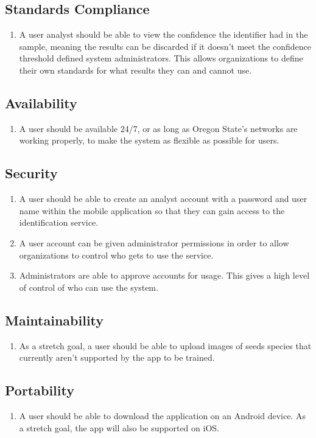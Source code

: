 \documentclass[onecolumn, draftclsnofoot,10pt, compsoc]{IEEEtran}
\begin{document}
\subsection{Standards Compliance}
\begin{enumerate}
\item
A user analyst should be able to view the confidence the identifier had in the sample, meaning the results can be discarded if it doesn't meet the confidence threshold defined system administrators. This allows organizations to define their own standards for what results they can and cannot use.
\end{enumerate}
\subsection{Availability}
\begin{enumerate}
\item
A user should be available 24/7, or as long as Oregon State's networks are working properly, to make the system as flexible as possible for users.
\end{enumerate}
\subsection{Security}

\begin{enumerate}
\item
A user should be able to create an analyst account with a password and user name within the mobile application so that they can gain access to the identification service.
\item
A user account can be given administrator permissions in order to allow organizations to control who gets to use the service. 
\item
Administrators are able to approve accounts for usage. This gives a high level of control of who can use the system.
\end{enumerate}

\subsection{Maintainability}
\begin{enumerate}
\item
As a stretch goal, a user should be able to upload images of seeds species that currently aren't supported by the app to be trained.
\end{enumerate}
\subsection{Portability}
\begin{enumerate}
\item
A user should be able to download the application on an Android device. As a stretch goal, the app will also be supported on iOS.
\end{enumerate}
\end{document}
